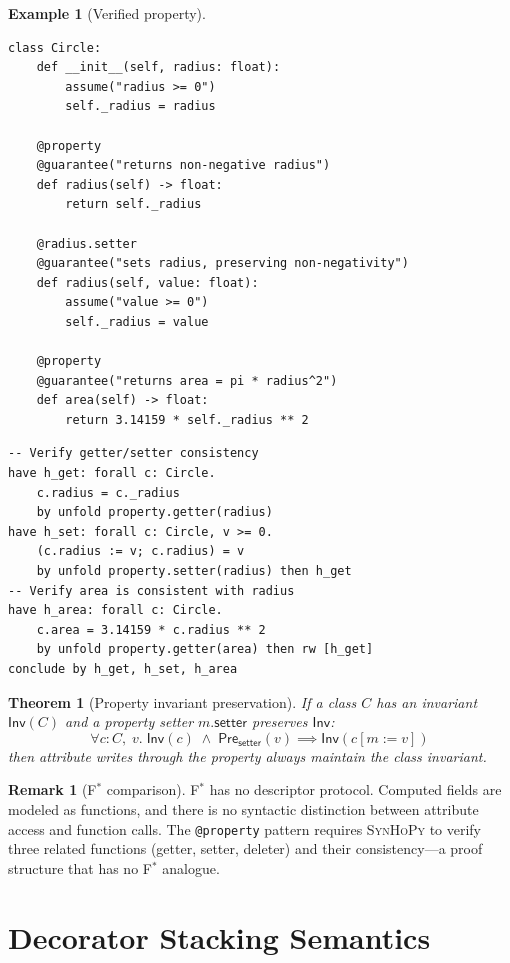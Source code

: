 \documentclass[11pt,a4paper]{report}
\theoremstyle{definition}
\newtheorem{example}[definition]{Example}
\newtheorem{remark}[definition]{Remark}
\theoremstyle{plain}
\newtheorem{theorem}[definition]{Theorem}
\newcommand{\Pre}{\mathsf{Pre}}
\newcommand{\Inv}{\mathsf{Inv}}
\newcommand{\fstar}{F$^{*}$}
\newcommand{\synhopy}{\textsc{SynHoPy}}
\begin{document}
\begin{example}[Verified property]
\begin{lstlisting}[style=synhopy]
class Circle:
    def __init__(self, radius: float):
        assume("radius >= 0")
        self._radius = radius

    @property
    @guarantee("returns non-negative radius")
    def radius(self) -> float:
        return self._radius

    @radius.setter
    @guarantee("sets radius, preserving non-negativity")
    def radius(self, value: float):
        assume("value >= 0")
        self._radius = value

    @property
    @guarantee("returns area = pi * radius^2")
    def area(self) -> float:
        return 3.14159 * self._radius ** 2
\end{lstlisting}

\begin{lstlisting}[style=proof]
-- Verify getter/setter consistency
have h_get: forall c: Circle.
    c.radius = c._radius
    by unfold property.getter(radius)
have h_set: forall c: Circle, v >= 0.
    (c.radius := v; c.radius) = v
    by unfold property.setter(radius) then h_get
-- Verify area is consistent with radius
have h_area: forall c: Circle.
    c.area = 3.14159 * c.radius ** 2
    by unfold property.getter(area) then rw [h_get]
conclude by h_get, h_set, h_area
\end{lstlisting}
\end{example}

\begin{theorem}[Property invariant preservation]
\label{thm:property-inv}
If a class $C$ has an invariant $\Inv(C)$ and a property setter
$m.\mathsf{setter}$ preserves $\Inv$:
\[
  \forall c : C,\; v.\; \Inv(c) \;\wedge\; \Pre_{\mathsf{setter}}(v)
  \implies \Inv(c[m := v])
\]
then attribute writes through the property always maintain the class invariant.
\end{theorem}

\begin{remark}[\fstar{} comparison]
\fstar{} has no descriptor protocol. Computed fields are modeled as functions,
and there is no syntactic distinction between attribute access and function
calls. The \texttt{@property} pattern requires \synhopy{} to verify three
related functions (getter, setter, deleter) and their consistency---a proof
structure that has no \fstar{} analogue.
\end{remark}


\section{Decorator Stacking Semantics}
\label{sec:decorator-stacking}
\end{document}
